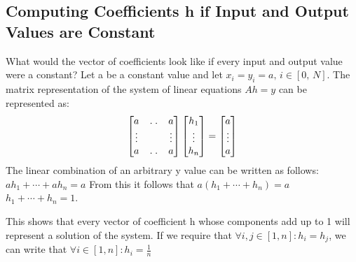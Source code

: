 \documentclass{article}
\begin{document}
\subsection{Computing Coefficients h if Input and Output Values are Constant}
\begin{flushleft}
What would the vector of coefficients look like if every input and output value were a constant? Let a be a constant value and let \begin{math}x_{i}= y_{i} = a, \, i \in [0, \, N]\end{math}. The matrix representation of the system of linear equations \begin{math} Ah = y \end{math} can be represented as:
\vspace{2mm}
\[
\begin{bmatrix}
    a & \hdotsfor{2} & a \\
    \vdots & \empty & \empty & \vdots \\
    a & \hdotsfor{2} & a
\end{bmatrix}
\begin{bmatrix}
    h_{1} \\
    \vdots \\
    h_{n}
\end{bmatrix}
=
\begin{bmatrix}
    a \\
    \vdots \\
    a
\end{bmatrix}
\]
\break
The linear combination of an arbitrary y value can be written as follows:
\begin{math}ah_{1} + \cdots + ah_{n} = a\end{math}
\break From this it follows that\newline	
\begin{math}a(h_{1} + \cdots + h_{n})= a\end{math} \newline
\begin{math}h_{1} + \cdots + h_{n} = 1\end{math}.
\end{flushleft}
This shows that every vector of coefficient h whose components add up to 1 will represent a solution of the system. \newline
If we require that \begin{math} \forall i, j \in [1, n]: h_{i} = h_{j}\end{math}, we can write that \begin{math} \forall i \in [1, n]: h_{i} = \frac{1}{n}\end{math}
\end{document}
